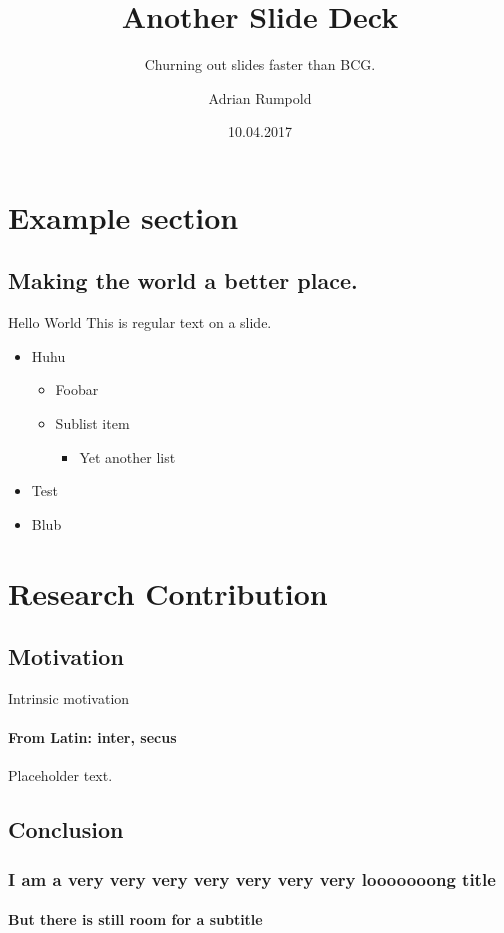 \documentclass{beamer}
\author{Adrian Rumpold}
\title{Another Slide Deck}
\subtitle{Churning out slides faster than BCG.}
\institute{Institute for Applied Beer Brewing, University of Augsburg}
\date{10.04.2017}
\begin{document}
\begin{frame}[plain]
  \titlepage
\end{frame}

\section{Example section}
\subsection{Making the world a better place.}
\begin{frame}{Hello World}
  This is regular text on a slide.
  
  \begin{itemize}
  \item Huhu
    \begin{itemize}
    \item Foobar
    \item Sublist item
      \begin{itemize}
      \item Yet another list
      \end{itemize}
    \end{itemize}
  \item Test
  \item Blub
  \end{itemize}
\end{frame}

\section{Research Contribution}
\subsection{Motivation}

\begin{frame}{Intrinsic motivation}
  \framesubtitle{From Latin: inter, secus}

  Placeholder text.
\end{frame}

\subsection{Conclusion}
\begin{frame}
  \frametitle{I am a very very very very very very very looooooong title}
  \framesubtitle{But there is still room for a subtitle}
\end{frame}
\end{document}
